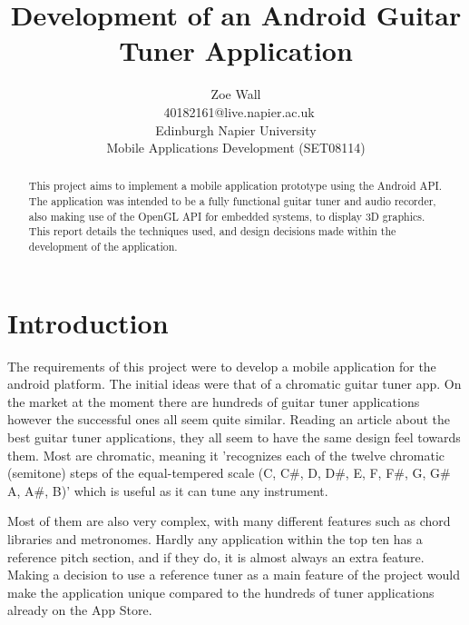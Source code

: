 \documentclass[conference]{acmsiggraph}
\title{Development of an Android Guitar Tuner Application}
\author{Zoe Wall \\\ 40182161@live.napier.ac.uk \\
Edinburgh Napier University \\
Mobile Applications Development (SET08114)}
\begin{document}

\maketitle

\begin{abstract} %
This project aims to implement a mobile application prototype using the Android API. The application was intended to be a fully functional guitar tuner and audio recorder, also making use of the OpenGL API for embedded systems, to display 3D graphics. This report details the techniques used, and design decisions made within the development of the application.
\end{abstract}

\keywordlist

\section{Introduction}

The requirements of this project were to develop a mobile application for the android platform. The initial ideas were that of a chromatic guitar tuner app. On the market at the moment there are hundreds of guitar tuner applications however the successful ones all seem quite similar. Reading an article about the best guitar tuner applications, they all seem to have the same design feel towards them. \cite{bestApps} Most are chromatic, meaning it 'recognizes each of the twelve chromatic (semitone) steps of the equal-tempered scale (C, C\#, D, D\#, E, F, F\#, G, G\# A, A\#, B)' which is useful as it can tune any instrument. \cite{Roland}

Most of them are also very complex, with many different features such as chord libraries and metronomes. Hardly any application within the top ten has a reference pitch section, and if they do, it is almost always an extra feature. Making a decision to use a reference tuner as a main feature of the project would make the application unique compared to the hundreds of tuner applications already on the App Store.
\end{document}
